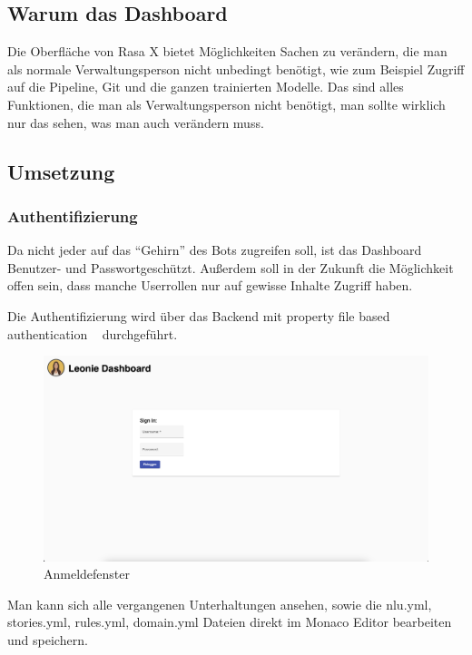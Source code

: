 \subsection{Warum das Dashboard}
Die Oberfläche von Rasa X bietet Möglichkeiten Sachen zu verändern, die man als normale Verwaltungsperson nicht unbedingt benötigt, wie zum Beispiel Zugriff auf die Pipeline, Git und die ganzen trainierten Modelle.
Das sind alles Funktionen, die man als Verwaltungsperson nicht benötigt, man sollte wirklich nur das sehen, was man auch verändern muss.

\subsection{Umsetzung}

\subsubsection{Authentifizierung}
Da nicht jeder auf das ``Gehirn'' des Bots zugreifen soll, ist das Dashboard Benutzer- und Passwortgeschützt.
Außerdem soll in der Zukunft die Möglichkeit offen sein, dass manche Userrollen nur auf gewisse Inhalte Zugriff haben.

Die Authentifizierung wird über das Backend mit property file based authentication ~\cite{authentication} durchgeführt.

\begin{figure}[hbt!]
    \centering
    \includegraphics[scale=0.2]{pics/signin}
    \caption{Anmeldefenster}
    \label{fig:impl:signin}
\end{figure}

Man kann sich alle vergangenen Unterhaltungen ansehen, sowie die nlu.yml, stories.yml, rules.yml, domain.yml Dateien direkt im Monaco Editor bearbeiten und speichern.


